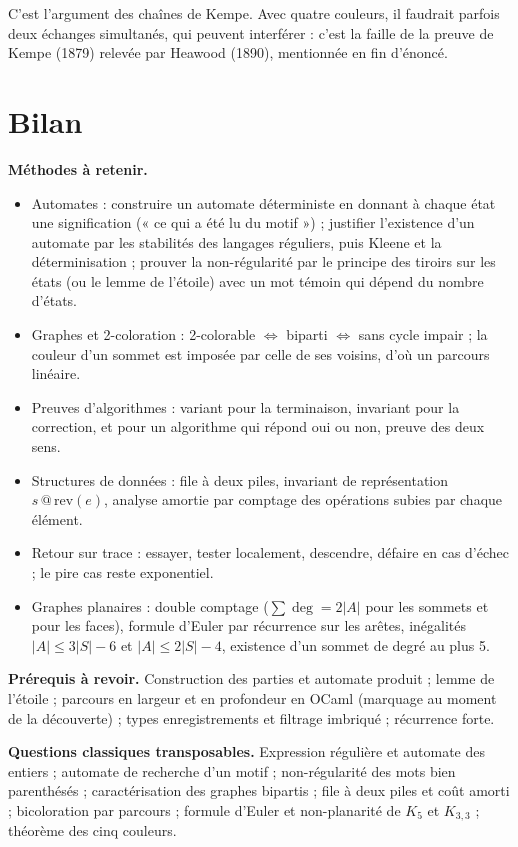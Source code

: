 \documentclass[11pt,a4paper]{article}
\providecommand{\tightlist}{\setlength{\itemsep}{0pt}\setlength{\parskip}{0pt}}
\newcommand{\equationajustee}[1]{%
  \sbox{\boiteequation}{$\displaystyle #1$}%
  \ifdim\wd\boiteequation>\linewidth
    \[\resizebox{\linewidth}{!}{\usebox{\boiteequation}}\]%
  \else
    \[#1\]%
  \fi}
\begin{document}
\equationajustee{\boxed{\,\text{Tout graphe planaire est 5-colorable.}\,}}

\begin{methode}

C'est l'argument des chaînes de Kempe. Avec quatre couleurs, il faudrait parfois deux échanges simultanés, qui peuvent interférer : c'est la faille de la preuve de Kempe (1879) relevée par Heawood (1890), mentionnée en fin d'énoncé.

\end{methode}

\hypertarget{bilan}{%
\section{Bilan}\label{bilan}}

\textbf{Méthodes à retenir.}

\begin{itemize}
\tightlist
\item
  Automates : construire un automate déterministe en donnant à chaque état une signification (« ce qui a été lu du motif ») ; justifier l'existence d'un automate par les stabilités des langages réguliers, puis Kleene et la déterminisation ; prouver la non-régularité par le principe des tiroirs sur les états (ou le lemme de l'étoile) avec un mot témoin qui dépend du nombre d'états.
\item
  Graphes et 2-coloration : 2-colorable \(\iff\) biparti \(\iff\) sans cycle impair ; la couleur d'un sommet est imposée par celle de ses voisins, d'où un parcours linéaire.
\item
  Preuves d'algorithmes : variant pour la terminaison, invariant pour la correction, et pour un algorithme qui répond oui ou non, preuve des deux sens.
\item
  Structures de données : file à deux piles, invariant de représentation \(s \mathbin{@} \mathrm{rev}(e)\), analyse amortie par comptage des opérations subies par chaque élément.
\item
  Retour sur trace : essayer, tester localement, descendre, défaire en cas d'échec ; le pire cas reste exponentiel.
\item
  Graphes planaires : double comptage (\(\sum \deg = 2|A|\) pour les sommets et pour les faces), formule d'Euler par récurrence sur les arêtes, inégalités \(|A| \le 3|S| - 6\) et \(|A| \le 2|S| - 4\), existence d'un sommet de degré au plus 5.
\end{itemize}

\textbf{Prérequis à revoir.} Construction des parties et automate produit ; lemme de l'étoile ; parcours en largeur et en profondeur en OCaml (marquage au moment de la découverte) ; types enregistrements et filtrage imbriqué ; récurrence forte.

\textbf{Questions classiques transposables.} Expression régulière et automate des entiers ; automate de recherche d'un motif ; non-régularité des mots bien parenthésés ; caractérisation des graphes bipartis ; file à deux piles et coût amorti ; bicoloration par parcours ; formule d'Euler et non-planarité de \(K_5\) et \(K_{3,3}\) ; théorème des cinq couleurs.
\end{document}
